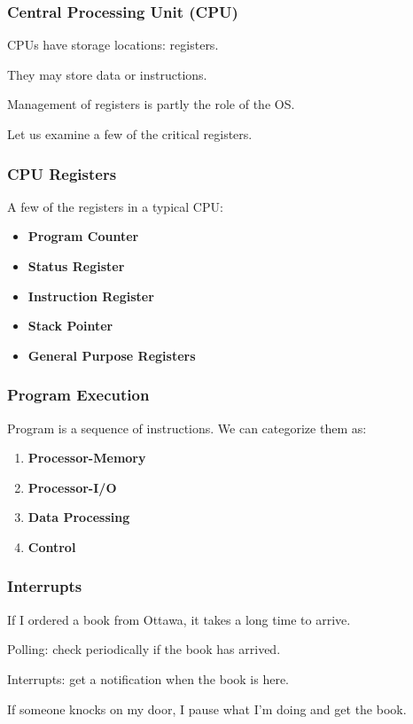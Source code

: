 \begin{frame}
\frametitle{Central Processing Unit (CPU)}
CPUs have storage locations: \alert{registers}.

They may store data or instructions.

Management of registers is partly the role of the OS.

Let us examine a few of the critical registers.

\end{frame}

\begin{frame}
\frametitle{CPU Registers}

A few of the registers in a typical CPU:

\begin{itemize}
	\item \textbf{Program Counter}
	\item \textbf{Status Register}
	\item \textbf{Instruction Register}
	\item \textbf{Stack Pointer}
	\item \textbf{General Purpose Registers}
\end{itemize}


\end{frame}


\begin{frame}
\frametitle{Program Execution}

Program is a sequence of instructions. We can categorize them as:

\begin{enumerate}
	\item \textbf{Processor-Memory}
	\item \textbf{Processor-I/O}
	\item \textbf{Data Processing}
	\item \textbf{Control} 
\end{enumerate}

\end{frame}

\begin{frame}
\frametitle{Interrupts}

If I ordered a book from Ottawa, it takes a long time to arrive.

Polling: check periodically if the book has arrived.

Interrupts: get a notification when the book is here.

If someone knocks on my door, I pause what I'm doing and get the book.


\end{frame}

